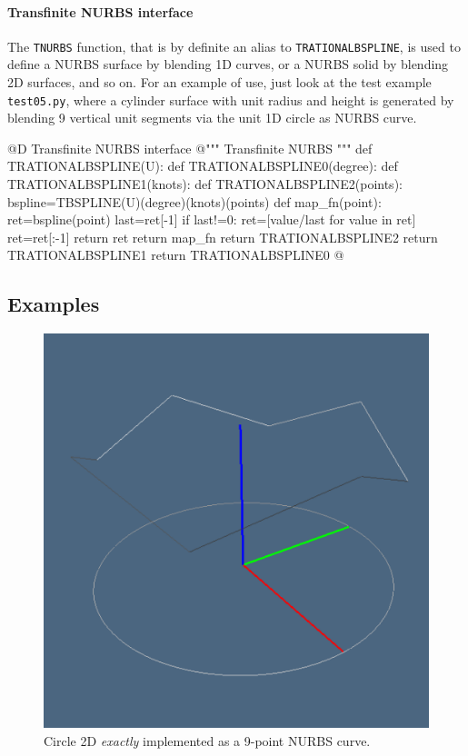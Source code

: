 \documentclass[11pt,oneside]{article}	%
\begin{document}
\paragraph{Transfinite NURBS interface}

The \texttt{TNURBS} function, that is by definite an alias to \texttt{TRATIONALBSPLINE},
is used to define a NURBS surface by blending 1D curves, or a NURBS solid by blending 2D surfaces, 
and so on. For an example of use, just look at the test example \texttt{test05.py},
where a cylinder surface with unit radius and height is generated by blending 9 vertical unit segments
via the unit 1D circle as NURBS curve. 

@D Transfinite NURBS interface
@{""" Transfinite NURBS """
def TRATIONALBSPLINE(U):
	def TRATIONALBSPLINE0(degree):
		def TRATIONALBSPLINE1(knots):
			def TRATIONALBSPLINE2(points):
				bspline=TBSPLINE(U)(degree)(knots)(points)
				def map_fn(point):			
					ret=bspline(point)
					last=ret[-1]
					if last!=0: ret=[value/last for value in ret]
					ret=ret[:-1]
					return ret
				return map_fn
			return TRATIONALBSPLINE2
		return TRATIONALBSPLINE1
	return TRATIONALBSPLINE0
@}

\subsection{Examples}


\begin{figure}[htbp] %
   \centering
   \includegraphics[width=0.33\linewidth]{images/nurbs-circle} 
   \caption{Circle 2D \emph{exactly} implemented as a 9-point NURBS curve.}
   \label{fig:example}
\end{figure}
\end{document}
